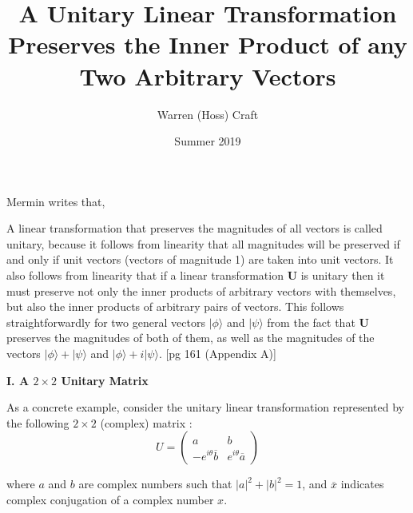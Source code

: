 \documentclass{article}
\title{A Unitary Linear Transformation Preserves the Inner Product of any Two Arbitrary Vectors}
\author{Warren (Hoss) Craft}
\date{Summer 2019}
\begin{document}
\maketitle

\flushleft


Mermin \cite{Mermin_2007} writes that,
\vspace{0.125in}
\begin{addmargin}[0.25in]{0.25in}
A linear transformation that preserves the magnitudes of all vectors is called unitary, because it follows from linearity that all magnitudes will be preserved if and only if unit vectors (vectors of magnitude 1) are taken into unit vectors. It also follows from linearity that if a linear transformation \textbf{U} is unitary then it must preserve not only the inner products of arbitrary vectors with themselves, but also the inner products of arbitrary pairs of vectors. This follows straightforwardly for two general vectors $|\phi\rangle$ and $|\psi\rangle$ from the fact that \textbf{U} preserves the magnitudes of both of them, as well as the magnitudes of the vectors $|\phi\rangle + |\psi\rangle$ and $|\phi\rangle + i|\psi\rangle$. [pg 161 (Appendix A)]
\end{addmargin}

\vspace{0.25in}

\textbf{I. A $2 \times 2$ Unitary Matrix}\par

\vspace{0.125in}
As a concrete example, consider the unitary linear transformation represented by the following $2 \times 2$ (complex) matrix \cite{wikipedia:UnitaryMatrix}:
\[
U = \begin{pmatrix}
a & b\\ -e^{i\theta}\overline{b} & e^{i\theta}\overline{a}
\end{pmatrix}
\]

where $a$ and $b$ are complex numbers such that $|a|^2 + |b|^2 = 1$, and $\overline{x}$ indicates complex conjugation of a complex number $x$.

\vspace{0.125in}
\end{document}
